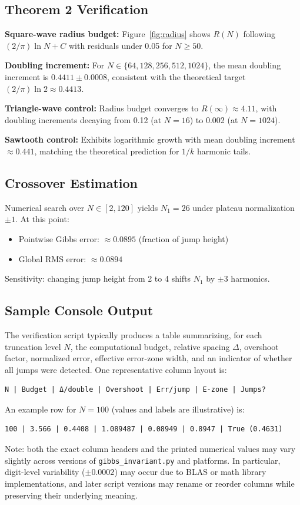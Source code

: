 \documentclass[11pt,letterpaper]{article}
\theoremstyle{remark}
\begin{document}
\subsection{Theorem 2 Verification}

\textbf{Square-wave radius budget:} Figure~\ref{fig:radius} shows $R(N)$ following $(2/\pi)\ln N + C$ with residuals under 0.05 for $N \ge 50$.

\textbf{Doubling increment:} For $N \in \{64, 128, 256, 512, 1024\}$, the mean doubling increment is $0.4411 \pm 0.0008$, consistent with the theoretical target $(2/\pi)\ln 2 \approx 0.4413$.

\textbf{Triangle-wave control:} Radius budget converges to $R(\infty) \approx 4.11$, with doubling increments decaying from 0.12 (at $N=16$) to 0.002 (at $N=1024$).

\textbf{Sawtooth control:} Exhibits logarithmic growth with mean doubling increment $\approx 0.441$, matching the theoretical prediction for $1/k$ harmonic tails.

\subsection{Crossover Estimation}

Numerical search over $N \in [2, 120]$ yields $N_1 = 26$ under plateau normalization $\pm 1$. At this point:
\begin{itemize}[nosep]
\item Pointwise Gibbs error: $\approx 0.0895$ (fraction of jump height)
\item Global RMS error: $\approx 0.0894$
\end{itemize}
Sensitivity: changing jump height from 2 to 4 shifts $N_1$ by $\pm 3$ harmonics.

\subsection{Sample Console Output}

The verification script typically produces a table summarizing, for each truncation level $N$, the computational budget, relative spacing $\Delta$, overshoot factor, normalized error, effective error-zone width, and an indicator of whether all jumps were detected. One representative column layout is:
\begin{verbatim}
N | Budget | Δ/double | Overshoot | Err/jump | E-zone | Jumps?
\end{verbatim}
An example row for $N=100$ (values and labels are illustrative) is:
\begin{verbatim}
100 | 3.566 | 0.4408 | 1.089487 | 0.08949 | 0.8947 | True (0.4631)
\end{verbatim}
Note: both the exact column headers and the printed numerical values may vary slightly across versions of \texttt{gibbs\_invariant.py} and platforms. In particular, digit-level variability ($\pm 0.0002$) may occur due to BLAS or math library implementations, and later script versions may rename or reorder columns while preserving their underlying meaning.
\end{document}

